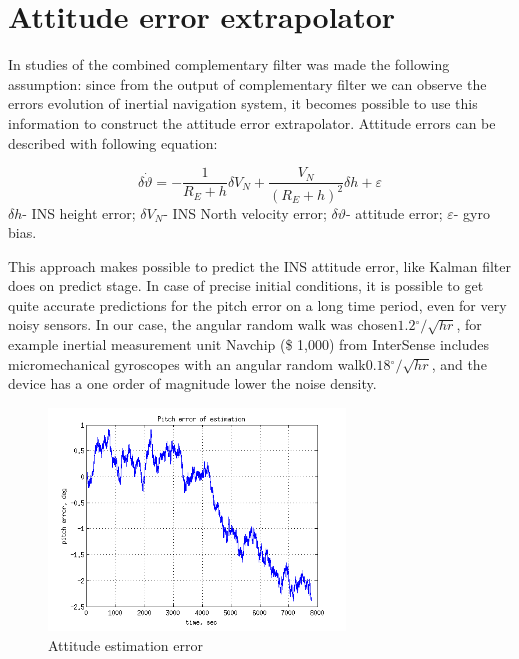 \documentclass[conference, utf8]{IEEEtran}
\begin{document}
\section{ Attitude error extrapolator}

In studies of the combined complementary filter was made the following assumption: since 
from the output of complementary filter we can observe the errors evolution of inertial 
navigation system, it becomes possible to use this information to construct the attitude 
error extrapolator. Attitude errors can be described with following equation:

\begin{equation}
 \delta \dot{\vartheta }=-\frac{1}{R_{E} +h} \delta V_{N} +\frac{V_{N} }{(R_{E} +h)^{2} } \delta h+\varepsilon
 \label{eq:ins_att}
\end{equation}
$\delta h$- INS height error; 
$\delta V_{N} $- INS North velocity error; 
$\delta \vartheta $- attitude error; 
$\varepsilon $- gyro bias.

This approach makes possible to predict the INS attitude error, 
like Kalman filter does on predict stage. In case of precise initial conditions, 
it is possible to get quite accurate predictions for the pitch error on a long 
time period, even for very noisy sensors. In our case, the angular random 
walk was chosen$1.2{}^\circ /\sqrt{hr} $, for example inertial measurement 
unit Navchip (\$ 1,000) from InterSense includes micromechanical gyroscopes 
with an angular random walk$0.18{}^\circ /\sqrt{hr} $, and the device has a 
one order of magnitude lower the noise density. 

\begin{figure}[!t]
  \centering
  \includegraphics[width=3.1in]{theta_err_of_err}
  \caption{Attitude estimation error}
  \label{fig:theta_err_err}
\end{figure}
\end{document}
